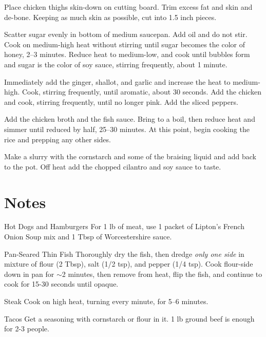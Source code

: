 \documentclass[oneside]{book}  %
\def\thisrecipe{}  %
\newcommand{\recipe}[1]{\section{#1}\def\thisrecipe{: #1}} %
\newcommand{\about}{$\sim$}
\begin{document}
\begin{directions}
  \item Place chicken thighs skin-down on cutting board. Trim excess fat and
    skin and de-bone. Keeping as much skin as possible, cut into 1.5 inch
    pieces.

  \item Scatter sugar evenly in bottom of medium saucepan. Add oil and do not
    stir. Cook on medium-high heat without stirring until sugar becomes the
    color of honey, 2--3 minutes. Reduce heat to medium-low, and cook until
    bubbles form and sugar is the color of soy sauce, stirring frequently, about
    1 minute.

  \item Immediately add the ginger, shallot, and garlic and increase the heat to
    medium-high. Cook, stirring frequently, until aromatic, about 30 seconds.
    Add the chicken and cook, stirring frequently, until no longer pink. Add the
    sliced peppers.

  \item Add the chicken broth and the fish sauce. Bring to a boil, then reduce
    heat and simmer until reduced by half, 25--30 minutes. At this point, begin
    cooking the rice and prepping any other sides.

  \item Make a slurry with the cornstarch and some of the braising liquid and
    add back to the pot. Off heat add the chopped cilantro and soy sauce to
    taste.
\end{directions}
\recipe{Notes} \label{notes:dinners_standalone} %
\begin{kitchennotes}
  \item[Hot Dogs and Hamburgers] \label{recipe:hot_dogs_and_hamburgers}
     
    For 1 lb of meat, use 1 packet of Lipton's French Onion Soup mix and 1 Tbsp
    of Worcestershire sauce.
  \item[Pan-Seared Thin Fish] \label{recipe:pan-seared_thin_fish}
     
    Thoroughly dry the fish, then dredge \emph{only one side} in mixture of
    flour (2 Tbsp), salt (1/2 tsp), and pepper (1/4 tsp). Cook flour-side down
    in pan for \about 2 minutes, then remove from heat, flip the fish, and
    continue to cook for 15-30 seconds until opaque.
  \item[Steak] \label{recipe:steak}
     
    Cook on high heat, turning every minute, for 5--6 minutes.
  \item[Tacos] \label{recipe:tacos}
     
    Get a seasoning with cornstarch or flour in it. 1 lb ground beef is enough
    for 2-3 people.
\end{kitchennotes}
\end{document}
